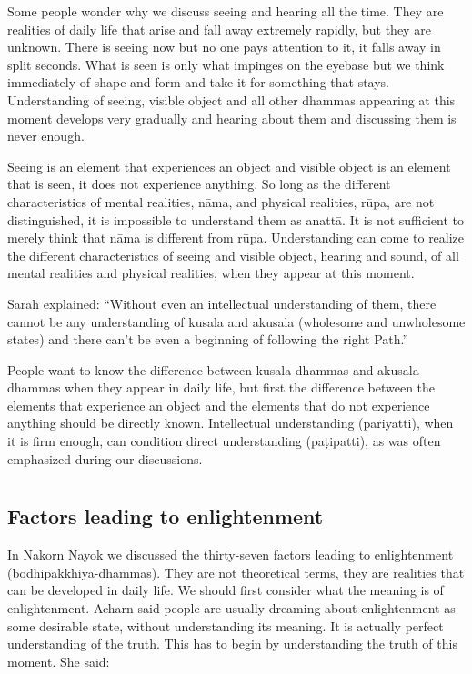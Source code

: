 Some people wonder why we discuss seeing and hearing all the time. They
are realities of daily life that arise and fall away extremely rapidly,
but they are unknown. There is seeing now but no one pays attention to
it, it falls away in split seconds. What is seen is only what impinges
on the eyebase but we think immediately of shape and form and take it
for something that stays. Understanding of seeing, visible object and
all other dhammas appearing at this moment develops very gradually and
hearing about them and discussing them is never enough.

Seeing is an element that experiences an object and visible object is an
element that is seen, it does not experience anything. So long as the
different characteristics of mental realities, nāma, and physical
realities, rūpa, are not distinguished, it is impossible to understand
them as anattā. It is not sufficient to merely think that nāma is
different from rūpa. Understanding can come to realize the different
characteristics of seeing and visible object, hearing and sound, of all
mental realities and physical realities, when they appear at this
moment.

Sarah explained: ``Without even an intellectual understanding of them,
there cannot be any understanding of kusala and akusala (wholesome and
unwholesome states) and there can't be even a beginning of following the
right Path.''

People want to know the difference between kusala dhammas and akusala
dhammas when they appear in daily life, but first the difference between
the elements that experience an object and the elements that do not
experience anything should be directly known. Intellectual understanding
(pariyatti), when it is firm enough, can condition direct understanding
(paṭipatti), as was often emphasized during our discussions.

\chapter[Factors leading to enlightenment]{}
\section*{Factors leading to enlightenment}

In Nakorn Nayok we discussed the thirty-seven factors leading to
enlightenment (bodhipakkhiya-dhammas). They are not theoretical terms,
they are realities that can be developed in daily life. We should first
consider what the meaning is of enlightenment. Acharn said people are
usually dreaming about enlightenment as some desirable state, without
understanding its meaning. It is actually perfect understanding of the
truth. This has to begin by understanding the truth of this moment. She
said:

